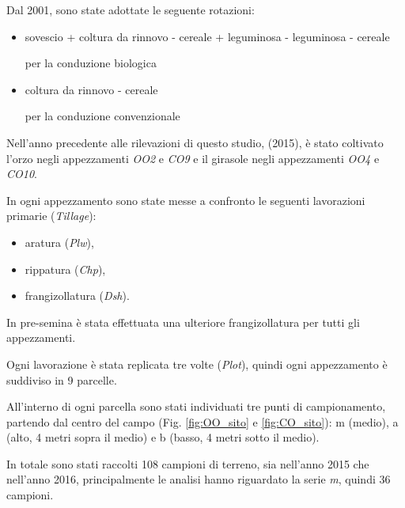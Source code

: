 \documentclass[11pt, a4paper, openright, titlepage, final, language = italian]{book}
\begin{document}
Dal 2001, sono state adottate le seguente rotazioni:
\begin{itemize} 
\item \small{sovescio + coltura
    da rinnovo - cereale + leguminosa - leguminosa - cereale} 

  per la conduzione biologica
\item  \small{coltura da rinnovo - cereale} 
  
  per la conduzione convenzionale
\end{itemize}

Nell'anno precedente alle rilevazioni di questo studio, (2015), \`e
stato coltivato l'orzo negli appezzamenti \emph{OO2} e \emph{CO9} e il
girasole negli appezzamenti \emph{OO4} e \emph{CO10}.

In ogni appezzamento sono state messe a confronto le seguenti
lavorazioni primarie (\textit{Tillage}):
\begin{itemize}
\item aratura (\emph{Plw}),
\item rippatura (\emph{Chp}),
\item frangizollatura (\emph{Dsh}).
\end{itemize}

In pre-semina \`e stata effettuata una ulteriore frangizollatura per
tutti gli appezzamenti.

Ogni lavorazione \`e stata replicata tre volte (\textit{Plot}), quindi
ogni appezzamento \`e suddiviso in 9 parcelle.


All'interno di ogni parcella sono stati individuati tre punti di
campionamento, partendo dal centro del campo (Fig. \ref{fig:OO_sito} e
\ref{fig:CO_sito}): m (medio), a (alto, 4
metri sopra il medio) e b (basso, 4 metri sotto il medio).



In totale sono stati raccolti 108 campioni di terreno, sia nell'anno
2015 che nell'anno 2016, principalmente le analisi hanno riguardato la
serie \emph{m}, quindi 36 campioni.
\end{document}

